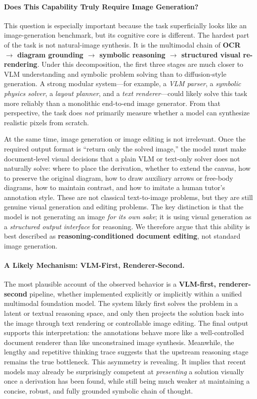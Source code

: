 \documentclass{llmxive}
\begin{document}
\paragraph{Does This Capability Truly Require Image Generation?}
This question is especially important because the task superficially looks like an image-generation benchmark, but its cognitive core is different. The hardest part of the task is not natural-image synthesis. It is the multimodal chain of \textbf{OCR $\rightarrow$ diagram grounding $\rightarrow$ symbolic reasoning $\rightarrow$ structured visual re-rendering}. Under this decomposition, the first three stages are much closer to VLM understanding and symbolic problem solving than to diffusion-style generation. A strong modular system---for example, a \emph{VLM parser}, a \emph{symbolic physics solver}, a \emph{layout planner}, and a \emph{text renderer}---could likely solve this task more reliably than a monolithic end-to-end image generator. From that perspective, the task does \emph{not} primarily measure whether a model can synthesize realistic pixels from scratch.

At the same time, image generation or image editing is not irrelevant. Once the required output format is ``return only the solved image,'' the model must make document-level visual decisions that a plain VLM or text-only solver does not naturally solve: where to place the derivation, whether to extend the canvas, how to preserve the original diagram, how to draw auxiliary arrows or free-body diagrams, how to maintain contrast, and how to imitate a human tutor's annotation style. These are not classical text-to-image problems, but they are still genuine visual generation and editing problems. The key distinction is that the model is not generating an image \emph{for its own sake}; it is using visual generation as a \emph{structured output interface} for reasoning. We therefore argue that this ability is best described as \textbf{reasoning-conditioned document editing}, not standard image generation.

\paragraph{A Likely Mechanism: VLM-First, Renderer-Second.}
The most plausible account of the observed behavior is a \textbf{VLM-first, renderer-second} pipeline, whether implemented explicitly or implicitly within a unified multimodal foundation model. The system likely first solves the problem in a latent or textual reasoning space, and only then projects the solution back into the image through text rendering or controllable image editing. The final output supports this interpretation: the annotations behave more like a well-controlled document renderer than like unconstrained image synthesis. Meanwhile, the lengthy and repetitive thinking trace suggests that the upstream reasoning stage remains the true bottleneck. This asymmetry is revealing. It implies that recent models may already be surprisingly competent at \emph{presenting} a solution visually once a derivation has been found, while still being much weaker at maintaining a concise, robust, and fully grounded symbolic chain of thought.
\end{document}
